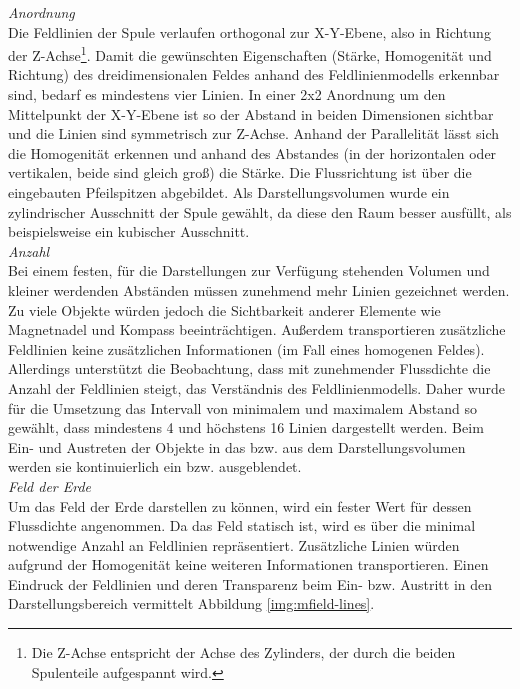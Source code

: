\textit{Anordnung}\\
Die Feldlinien der Spule verlaufen orthogonal zur X-Y-Ebene, also in Richtung der Z-Achse\footnote{Die Z-Achse entspricht der Achse des Zylinders, der durch die beiden Spulenteile aufgespannt wird.}. Damit die gewünschten Eigenschaften (Stärke, Homogenität und Richtung) des dreidimensionalen Feldes anhand des Feldlinienmodells erkennbar sind, bedarf es mindestens vier Linien. In einer 2x2 Anordnung um den Mittelpunkt der X-Y-Ebene ist so der Abstand in beiden Dimensionen sichtbar und die Linien sind symmetrisch zur Z-Achse. Anhand der Parallelität lässt sich die Homogenität erkennen und anhand des Abstandes (in der horizontalen oder vertikalen, beide sind gleich groß) die Stärke. Die Flussrichtung ist über die eingebauten Pfeilspitzen abgebildet. Als Darstellungsvolumen wurde ein zylindrischer Ausschnitt der Spule gewählt, da diese den Raum besser ausfüllt, als beispielsweise ein kubischer Ausschnitt.\\

\textit{Anzahl}\\
Bei einem festen, für die Darstellungen zur Verfügung stehenden Volumen und kleiner werdenden Abständen müssen zunehmend mehr Linien gezeichnet werden. Zu viele Objekte würden jedoch die Sichtbarkeit anderer Elemente wie Magnetnadel und Kompass beeinträchtigen. Außerdem transportieren zusätzliche Feldlinien keine zusätzlichen Informationen (im Fall eines homogenen Feldes). Allerdings unterstützt die Beobachtung, dass mit zunehmender Flussdichte die Anzahl der Feldlinien steigt, das Verständnis des Feldlinienmodells. Daher wurde für die Umsetzung das Intervall von minimalem und maximalem Abstand so gewählt, dass mindestens 4 und höchstens 16 Linien dargestellt werden. Beim Ein- und Austreten der Objekte in das bzw. aus dem Darstellungsvolumen werden sie kontinuierlich ein bzw. ausgeblendet.\\

\textit{Feld der Erde}\\
Um das Feld der Erde darstellen zu können, wird ein fester Wert für dessen Flussdichte angenommen. Da das Feld statisch ist, wird es über die minimal notwendige Anzahl an Feldlinien repräsentiert. Zusätzliche Linien würden aufgrund der Homogenität keine weiteren Informationen transportieren. Einen Eindruck der Feldlinien und deren Transparenz beim Ein- bzw. Austritt in den Darstellungsbereich vermittelt Abbildung \ref{img:mfield-lines}.

